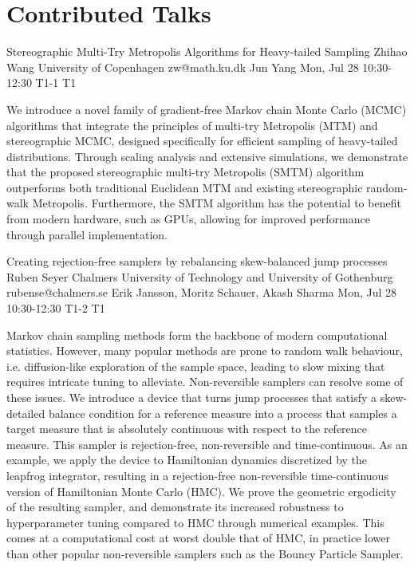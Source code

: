\section{Contributed Talks}

\begin{talk}
  {Stereographic Multi-Try Metropolis Algorithms for Heavy-tailed Sampling}%
  {Zhihao Wang}%
  {University of Copenhagen}%
  {zw@math.ku.dk}%
  {Jun Yang}%
  {}%
  {Mon, Jul 28 10:30-12:30}%
  {T1-1}%
  {T1}%
  
				
			
We introduce a novel family of gradient-free Markov chain Monte Carlo (MCMC) algorithms that integrate the principles of multi-try Metropolis (MTM) and stereographic MCMC, designed specifically for efficient sampling of heavy-tailed distributions. Through scaling analysis and extensive simulations, we demonstrate that the proposed stereographic multi-try Metropolis (SMTM) algorithm outperforms both traditional Euclidean MTM and existing stereographic random-walk Metropolis. Furthermore, the SMTM algorithm has the potential to benefit from modern hardware, such as GPUs, allowing for improved performance through parallel implementation.
\end{talk}

\begin{talk}
  {Creating rejection-free samplers by rebalancing skew-balanced jump processes}%
  {Ruben Seyer}%
  {Chalmers University of Technology and University of Gothenburg}%
  {rubense@chalmers.se}%
  {Erik Jansson, Moritz Schauer, Akash Sharma}%
  {}%
  {Mon, Jul 28 10:30-12:30}%
  {T1-2}%
  {T1}%
  
				
			
Markov chain sampling methods form the backbone of modern computational statistics.
However, many popular methods are prone to random walk behaviour, i.e.\@{} diffusion-like exploration of the sample space, leading to slow mixing that requires intricate tuning to alleviate.
Non-reversible samplers can resolve some of these issues.
We introduce a device that turns jump processes that satisfy a skew-detailed balance condition for a reference measure into a process that samples a target measure that is absolutely continuous with respect to the reference measure.
This sampler is rejection-free, non-reversible and time-continuous.
As an example, we apply the device to Hamiltonian dynamics discretized by the leapfrog integrator, resulting in a rejection-free non-reversible time-continuous version of Hamiltonian Monte Carlo (HMC).
We prove the geometric ergodicity of the resulting sampler, and demonstrate its increased robustness to hyperparameter tuning compared to HMC through numerical examples.
This comes at a computational cost at worst double that of HMC, in practice lower than other popular non-reversible samplers such as the Bouncy Particle Sampler.
\end{talk}

